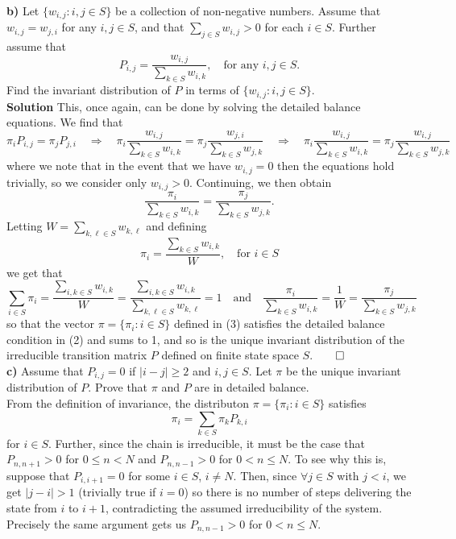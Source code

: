 \documentclass[11pt, letterpaper]{article}
\begin{document}
    {\bf b)} Let $\{w_{i,j}:i,j\in S\}$ be a collection of non-negative numbers. Assume that $w_{i,j}=w_{j,i}$ for any $i,j\in S$, and that $\sum_{j\in S}w_{i,j}>0$ for each $i\in S$. Further assume that
    \[P_{i,j}=\frac{w_{i,j}}{\sum_{k\in S}w_{i,k}},\quad\text{for any $i,j\in S$.}\]
    Find the invariant distribution of $P$ in terms of $\{w_{i,j}:i,j\in S\}$.\\[10pt]
    {\bf Solution} This, once again, can be done by solving the detailed balance equations. We find that
    \[\pi_i P_{i,j}=\pi_j P_{j,i}\quad\Rightarrow\quad \pi_{i}\frac{w_{i,j}}{\sum_{k\in S}w_{i,k}}=\pi_j\frac{w_{j,i}}{\sum_{k\in S}w_{j,k}}\quad\Rightarrow\quad\pi_{i}\frac{w_{i,j}}{\sum_{k\in S}w_{i,k}}=\pi_j\frac{w_{i,j}}{\sum_{k\in S}w_{j,k}}\]
    where we note that in the event that we have $w_{i,j}=0$ then the equations hold trivially, so we consider only $w_{i,j}>0$. Continuing, we then obtain
    \[\frac{\pi_i}{\sum_{k\in S}w_{i,k}}=\frac{\pi_j}{\sum_{k\in S}w_{j,k}}.\tag{2}\]
    Letting $W=\sum_{k,\ell\in S}w_{k,\ell}$ and defining 
    \[\pi_i=\frac{\sum_{k\in S}w_{i,k}}{W},\quad\text{for $i\in S$}\tag{3}\]
    we get that
    \[\sum_{i\in S}\pi_i=\frac{\sum_{i,k\in S}w_{i,k}}{W}=\frac{\sum_{i,k\in S}w_{i,k}}{\sum_{k,\ell\in S}w_{k,\ell}}=1\quad\text{and}\quad \frac{\pi_i}{\sum_{k\in S}w_{i,k}}=\frac{1}{W}=\frac{\pi_j}{\sum_{k\in S}w_{j,k}}\]
    so that the vector $\pi=\{\pi_i:i\in S\}$ defined in (3) satisfies the detailed balance condition in (2) and sums to 1, and so is the unique invariant distribution of the irreducible transition matrix $P$ defined on finite state space $S$.\hfill{$\qed$}\\[10pt]
    {\bf c)} Assume that $P_{i,j}=0$ if $|i-j|\geq2$ and $i,j\in S$. Let $\pi$ be the unique invariant distribution of $P$. Prove that $\pi$ and $P$ are in detailed balance.\\[10pt]
    From the definition of invariance, the distributon $\pi=\{\pi_i:i\in S\}$ satisfies
    \[\pi_i=\sum_{k\in S}\pi_k P_{k,i}\]
    for $i\in S$. Further, since the chain is irreducible, it must be the case that $P_{n,n+1}>0$ for $0\leq n<N$ and $P_{n,n-1}>0$ for $0<n\leq N$. To see why this is, suppose that $P_{i,i+1}=0$ for some $i\in S$, $i\neq N$. Then, since $\forall j\in S$ with $j<i$, we get $|j-i|>1$ (trivially true if $i=0$) so there is no number of steps
    delivering the state from $i$ to $i+1$, contradicting the assumed irreducibility of the system. Precisely the same argument gets us $P_{n,n-1}>0$ for $0<n\leq N$.\\[10pt]
\end{document}
